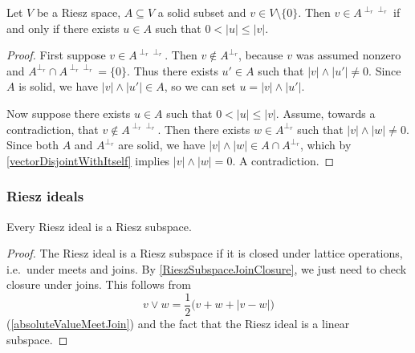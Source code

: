 \begin{proposition} \label{disjointDoublePolarConstruction}
Let $V$ be a Riesz space, $A\subseteq V$ a solid subset and $v\in V\setminus\{0\}$. Then $v\in A^{\perp_r\perp_r}$ \textup{if and only if} there exists $u\in A$ such that $0 < |u| \leq |v|$.
\end{proposition}
\begin{proof}
First suppose $v\in A^{\perp_r\perp_r}$. Then $v\notin A^{\perp_r}$, because $v$ was assumed nonzero and $A^{\perp_r}\cap A^{\perp_r\perp_r} = \{0\}$. Thus there exists $u'\in A$ such that $|v|\wedge |u'| \neq 0$. Since $A$ is solid, we have $|v|\wedge |u'| \in A$, so we can set $u = |v|\wedge |u'|$.

Now suppose there exists $u\in A$ such that $0 < |u| \leq |v|$. Assume, towards a contradiction, that $v\notin A^{\perp_r\perp_r}$. Then there exists $w\in A^{\perp_r}$ such that $|v|\wedge |w| \neq 0$. Since both $A$ and $A^{\perp_r}$ are solid, we have $|v|\wedge |w| \in A\cap A^{\perp_r}$, which by \ref{vectorDisjointWithItself} implies $|v|\wedge |w| = 0$. A contradiction.
\end{proof}

\subsubsection{Riesz ideals}
\begin{lemma} \label{RieszIdealRieszSubspace}
Every Riesz ideal is a Riesz subspace.
\end{lemma}
\begin{proof}
The Riesz ideal is a Riesz subspace if it is closed under lattice operations, i.e.\ under meets and joins. By \ref{RieszSubspaceJoinClosure}, we just need to check closure under joins. This follows from
\[ v \vee w = \frac{1}{2}\big(v+ w+|v-w|\big) \]
(\ref{absoluteValueMeetJoin}) and the fact that the Riesz ideal is a linear subspace.
\end{proof}

